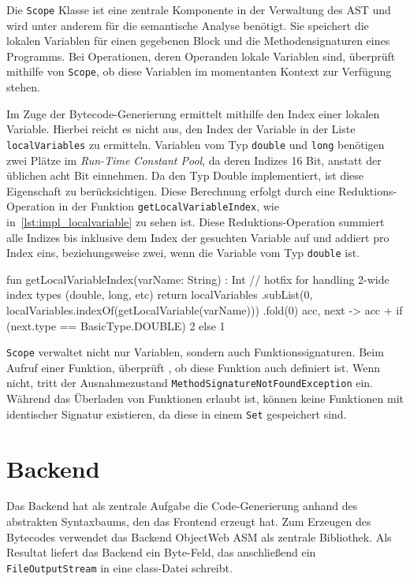 Die \texttt{Scope} Klasse ist eine zentrale Komponente in der Verwaltung des AST und wird unter anderem für die semantische Analyse benötigt. Sie speichert die lokalen Variablen für einen gegebenen Block und die Methodensignaturen eines \toya Programms. Bei Operationen, deren Operanden lokale Variablen sind, überprüft \toya mithilfe von \texttt{Scope}, ob diese Variablen im momentanten Kontext zur Verfügung stehen.

Im Zuge der Bytecode-Generierung ermittelt \toya mithilfe \scope den Index einer lokalen Variable. Hierbei reicht es nicht aus, den Index der Variable in der Liste \texttt{localVariables} zu ermitteln. Variablen vom Typ \texttt{double} und \texttt{long} benötigen zwei Plätze im \textit{Run-Time Constant Pool}, da deren Indizes 16 Bit, anstatt der üblichen acht Bit einnehmen. Da \toya den Typ Double implementiert, ist diese Eigenschaft zu berücksichtigen. Diese Berechnung erfolgt durch eine Reduktions-Operation in der Funktion \texttt{getLocalVariableIndex}, wie in~\autoref{lst:impl_localvariable} zu sehen ist. Diese Reduktions-Operation summiert alle Indizes bis inklusive dem Index der gesuchten Variable auf und addiert pro Index eins, beziehungsweise zwei, wenn die Variable vom Typ \texttt{double} ist.

\begin{KotlinCode}[numbers=none, caption={Ermittlung des Index einer Variable in einem \texttt{Scope}}, label=lst:impl_localvariable]
fun getLocalVariableIndex(varName: String) : Int {
    // hotfix for handling 2-wide index types (double, long, etc)
    return localVariables
        .subList(0, localVariables.indexOf(getLocalVariable(varName)))
        .fold(0) { acc, next ->
            acc + if (next.type == BasicType.DOUBLE) 2 else 1
        }
}
\end{KotlinCode}

\texttt{Scope} verwaltet nicht nur Variablen, sondern auch Funktionssignaturen. Beim Aufruf einer Funktion, überprüft \scope, ob diese Funktion auch definiert ist. Wenn nicht, tritt der Ausnahmezustand \texttt{MethodSignatureNotFoundException} ein. Während das Überladen von Funktionen erlaubt ist, können keine Funktionen mit identischer Signatur existieren, da diese in einem \texttt{Set} gespeichert sind.

\section{Backend}

Das Backend hat als zentrale Aufgabe die Code-Generierung anhand des abstrakten Syntaxbaums, den das Frontend erzeugt hat. Zum Erzeugen des Bytecodes verwendet das Backend ObjectWeb ASM als zentrale Bibliothek. Als Resultat liefert das Backend ein Byte-Feld, das anschließend ein \texttt{FileOutputStream} in eine class-Datei schreibt.

